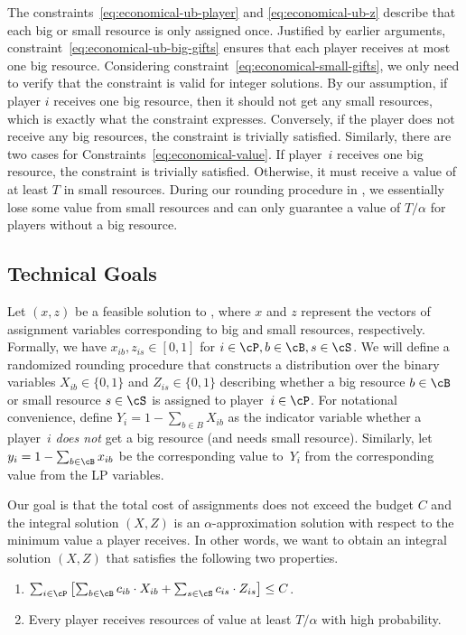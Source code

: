 \documentclass[a4paper,USenglish,cleveref,thm-restate]{lipics-v2021}
\begin{document}
The constraints~\eqref{eq:economical-ub-player} and \eqref{eq:economical-ub-z} describe that
each big or small resource is only assigned once.
Justified by earlier arguments, constraint~\eqref{eq:economical-ub-big-gifts} ensures that each player receives at most one big resource.
Considering constraint~\eqref{eq:economical-small-gifts}, we only need to verify that the constraint is valid for integer solutions.
By our
assumption, if player $i$ receives one big resource, then it should not get any small resources,
which is exactly what the constraint expresses. Conversely, if the player does not receive any big resources, the
constraint is trivially satisfied. Similarly, there are two cases for
Constraints~\eqref{eq:economical-value}. If
player~$i$ receives one big resource, the constraint is trivially satisfied. Otherwise, it must receive a value of at least $T$ in small resources. During our rounding procedure in , we essentially lose
some value from small resources and can only guarantee
a value of $T/\alpha$ for players without a big resource.

\subsection{Technical Goals}
Let $(x, z)$ be a feasible solution to , where $x$ and $z$ represent the vectors of assignment variables corresponding to big and small resources, respectively. Formally, we have $x_{ib}, z_{is} \in [0,1]$ for $i \in \cP, b\in \cB, s \in \cS$.
We will define a randomized rounding procedure that constructs
a distribution over the binary variables
$X_{ib} \in \{0,1\}$ and $Z_{is}\in\{0, 1\}$ describing whether a big resource $b \in \cB$ or small resource $s\in \cS$ is assigned to player~$i \in \cP$.
For notational convenience, define $Y_i = 1 - \sum_{b\in B} X_{ib}$ as the indicator variable whether a player~$i$ \emph{does not}
get a big resource (and needs small resource). Similarly, let $y_i = 1 - \sum_{b\in \cB} x_{ib}$ be the corresponding value to~$Y_i$ from the corresponding value from the LP variables.

Our goal is that the total cost of assignments does not exceed the budget $C$ and the integral solution $(X,Z)$ is an $\alpha$-approximation solution with respect to the minimum value a player
receives. In other words, we want to obtain an integral solution $(X,Z)$ that satisfies the following two properties.
\smallskip
\begin{enumerate}
    \item $\sum_{i \in \cP}^{} \left[\sum_{b \in \cB}^{}c_{ib}\cdot X_{ib} + \sum_{s \in \cS}^{}c_{is}\cdot Z_{is} \right] \leq C$.
    
    \item Every player receives resources of value at least $T/\alpha$ with high probability.
\end{enumerate}
\end{document}
